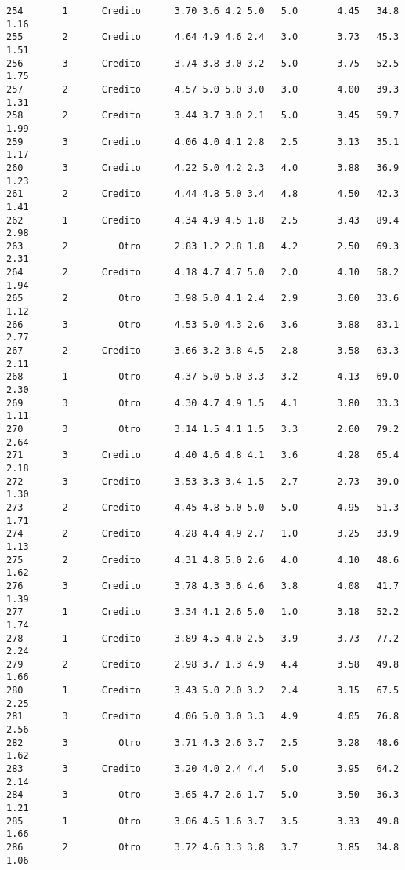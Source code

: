 \documentclass[
  letterpaper,
  DIV=11,
  numbers=noendperiod]{scrartcl}
\begin{document}
\begin{verbatim}
254       1      Credito      3.70 3.6 4.2 5.0   5.0       4.45   34.8    1.16
255       2      Credito      4.64 4.9 4.6 2.4   3.0       3.73   45.3    1.51
256       3      Credito      3.74 3.8 3.0 3.2   5.0       3.75   52.5    1.75
257       2      Credito      4.57 5.0 5.0 3.0   3.0       4.00   39.3    1.31
258       2      Credito      3.44 3.7 3.0 2.1   5.0       3.45   59.7    1.99
259       3      Credito      4.06 4.0 4.1 2.8   2.5       3.13   35.1    1.17
260       3      Credito      4.22 5.0 4.2 2.3   4.0       3.88   36.9    1.23
261       2      Credito      4.44 4.8 5.0 3.4   4.8       4.50   42.3    1.41
262       1      Credito      4.34 4.9 4.5 1.8   2.5       3.43   89.4    2.98
263       2         Otro      2.83 1.2 2.8 1.8   4.2       2.50   69.3    2.31
264       2      Credito      4.18 4.7 4.7 5.0   2.0       4.10   58.2    1.94
265       2         Otro      3.98 5.0 4.1 2.4   2.9       3.60   33.6    1.12
266       3         Otro      4.53 5.0 4.3 2.6   3.6       3.88   83.1    2.77
267       2      Credito      3.66 3.2 3.8 4.5   2.8       3.58   63.3    2.11
268       1         Otro      4.37 5.0 5.0 3.3   3.2       4.13   69.0    2.30
269       3         Otro      4.30 4.7 4.9 1.5   4.1       3.80   33.3    1.11
270       3         Otro      3.14 1.5 4.1 1.5   3.3       2.60   79.2    2.64
271       3      Credito      4.40 4.6 4.8 4.1   3.6       4.28   65.4    2.18
272       3      Credito      3.53 3.3 3.4 1.5   2.7       2.73   39.0    1.30
273       2      Credito      4.45 4.8 5.0 5.0   5.0       4.95   51.3    1.71
274       2      Credito      4.28 4.4 4.9 2.7   1.0       3.25   33.9    1.13
275       2      Credito      4.31 4.8 5.0 2.6   4.0       4.10   48.6    1.62
276       3      Credito      3.78 4.3 3.6 4.6   3.8       4.08   41.7    1.39
277       1      Credito      3.34 4.1 2.6 5.0   1.0       3.18   52.2    1.74
278       1      Credito      3.89 4.5 4.0 2.5   3.9       3.73   77.2    2.24
279       2      Credito      2.98 3.7 1.3 4.9   4.4       3.58   49.8    1.66
280       1      Credito      3.43 5.0 2.0 3.2   2.4       3.15   67.5    2.25
281       3      Credito      4.06 5.0 3.0 3.3   4.9       4.05   76.8    2.56
282       3         Otro      3.71 4.3 2.6 3.7   2.5       3.28   48.6    1.62
283       3      Credito      3.20 4.0 2.4 4.4   5.0       3.95   64.2    2.14
284       3         Otro      3.65 4.7 2.6 1.7   5.0       3.50   36.3    1.21
285       1         Otro      3.06 4.5 1.6 3.7   3.5       3.33   49.8    1.66
286       2         Otro      3.72 4.6 3.3 3.8   3.7       3.85   34.8    1.06

\end{verbatim}
\end{document}
